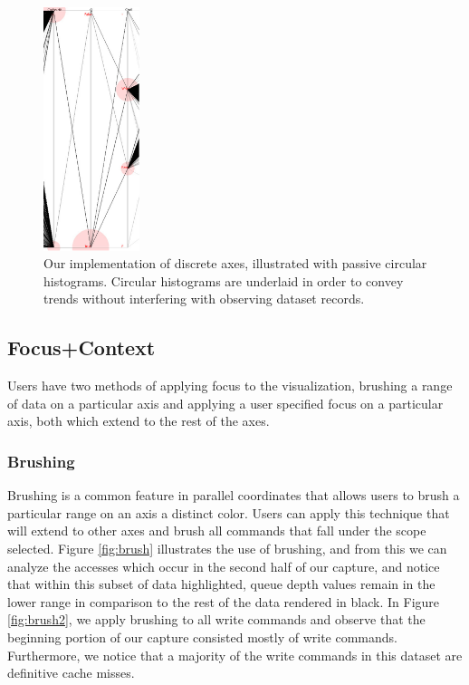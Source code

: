 \documentclass[journal]{vgtc}                %
\begin{document}
\begin{figure}[h!]
 \centering
 \includegraphics[width=0.25\textwidth]{images/discrete.eps}
 \caption[Discrete axes illustrated with circular histograms to convey trends.]{Our implementation of discrete axes, illustrated with passive circular histograms. Circular histograms are underlaid in order to convey trends without interfering with observing dataset records.}
 \label{fig:histograms}
\end{figure}

\subsection{Focus+Context}
Users have two methods of applying focus to the visualization, brushing a range of data on a particular axis and applying a user specified focus on a particular axis, both which extend to the rest of the axes.

\subsubsection{Brushing}
Brushing is a common feature in parallel coordinates that allows users to brush a particular range on an axis a distinct color. Users can apply this technique that will extend to other axes and brush all commands that fall under the scope selected. Figure \ref{fig:brush} illustrates the use of brushing, and from this we can analyze the accesses which occur in the second half of our capture, and notice that within this subset of data highlighted, queue depth values remain in the lower range in comparison to the rest of the data rendered in black. In Figure \ref{fig:brush2}, we apply brushing to all write commands and observe that the beginning portion of our capture consisted mostly of write commands. Furthermore, we notice that a majority of the write commands in this dataset are definitive cache misses.
\end{document}
